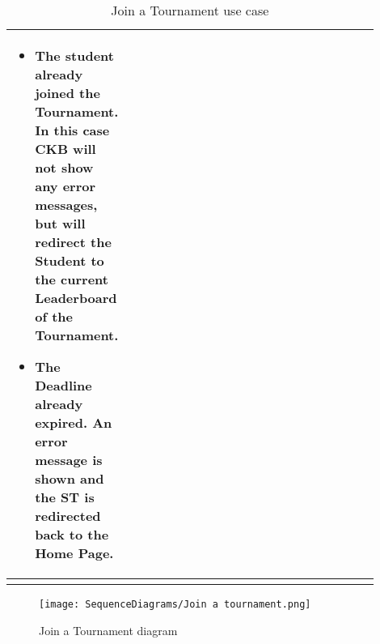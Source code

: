 \begin{center}
\begin{longtable}{|l|p{0.9\linewidth}|}
\begin{itemize}
            \item The student already joined the Tournament. In this case CKB will not show any error messages, but will redirect the Student to the current Leaderboard of the Tournament.
            \item The Deadline already expired. An error message is shown and the ST is redirected back to the Home Page.
        \end{itemize}    \\
        \hline
        \caption{Join a Tournament use case}
        \label{tab: join_a_Tournament_use_case}
    \end{longtable}
\end{center}

\begin{figure}[H]
    \begin{center}
        \texttt{[image: SequenceDiagrams/Join a tournament.png]}
        \caption{Join a Tournament diagram}
        \label{fig:join_a_Tournament_seqd}%
    \end{center}
\end{figure}

